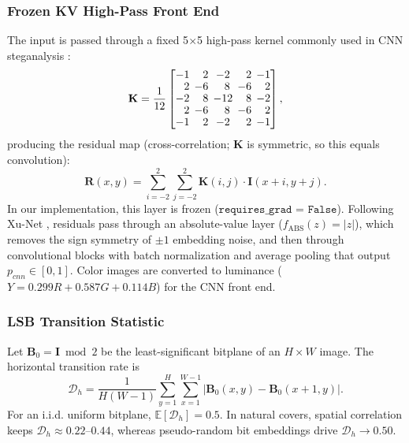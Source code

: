 \documentclass[conference]{IEEEtran}
\begin{document}
\subsubsection{Frozen KV High-Pass Front End}
The input is passed through a fixed 5$\times$5 high-pass kernel commonly used in CNN steganalysis \cite{xu2016structural, fridrich2012rich}:
\begin{equation}
\begingroup
\renewcommand{\arraystretch}{0.90}
\setlength{\arraycolsep}{2.2pt}
\mathbf{K} = \frac{1}{12} \begin{bmatrix}
-1 & \phantom{-}2 & -2 & \phantom{-}2 & -1 \\
\phantom{-}2 & -6 & \phantom{-}8 & -6 & \phantom{-}2 \\
-2 & \phantom{-}8 & -12 & \phantom{-}8 & -2 \\
\phantom{-}2 & -6 & \phantom{-}8 & -6 & \phantom{-}2 \\
-1 & \phantom{-}2 & -2 & \phantom{-}2 & -1
\end{bmatrix},
\endgroup
\end{equation}
producing the residual map (cross-correlation; $\mathbf{K}$ is symmetric, so this equals convolution):
\begin{equation}
    \mathbf{R}(x, y) = \sum_{i=-2}^{2} \sum_{j=-2}^{2} \mathbf{K}(i, j) \cdot \mathbf{I}(x+i, y+j).
\end{equation}
In our implementation, this layer is frozen ($\texttt{requires\_grad = False}$). Following Xu-Net \cite{xu2016structural}, residuals pass through an absolute-value layer ($f_{\text{ABS}}(z) = |z|$), which removes the sign symmetry of $\pm 1$ embedding noise, and then through convolutional blocks with batch normalization and average pooling that output $p_{cnn} \in [0, 1]$. Color images are converted to luminance ($Y = 0.299R + 0.587G + 0.114B$) for the CNN front end.

\subsubsection{LSB Transition Statistic}
Let $\mathbf{B}_0 = \mathbf{I} \bmod 2$ be the least-significant bitplane of an $H \times W$ image. The horizontal transition rate is
\begin{equation}
    \mathcal{D}_h = \frac{1}{H(W-1)} \sum_{y=1}^{H} \sum_{x=1}^{W-1} |\mathbf{B}_0(x, y) - \mathbf{B}_0(x+1, y)|.
\end{equation}
For an i.i.d. uniform bitplane, $\mathbb{E}[\mathcal{D}_h] = 0.5$. In natural covers, spatial correlation keeps $\mathcal{D}_h \approx 0.22\text{--}0.44$, whereas pseudo-random bit embeddings drive $\mathcal{D}_h \to 0.50$.
\end{document}
